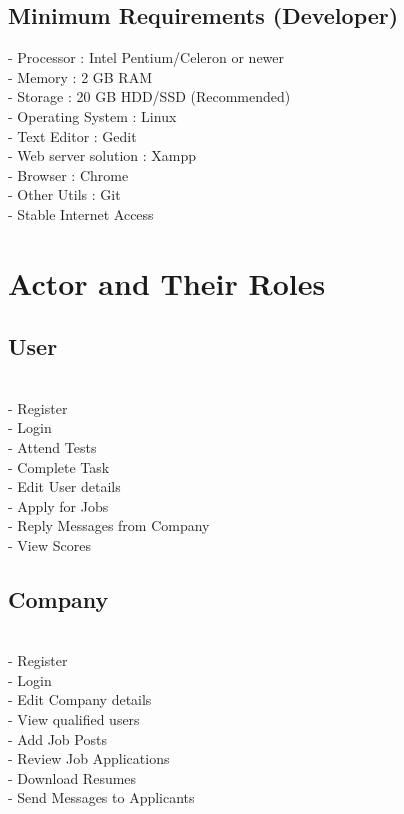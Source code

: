 \documentclass[a4paper,12pt]{report}
\begin{document}
\subsection{Minimum Requirements (Developer)}
\hspace*{12pt}
\subitem - Processor : Intel Pentium/Celeron or newer \\
\subitem - Memory : 2 GB RAM \\
\subitem - Storage : 20 GB HDD/SSD (Recommended) \\
\subitem - Operating System : Linux\\
\subitem - Text Editor : Gedit\\
\subitem - Web server solution : Xampp\\
\subitem - Browser : Chrome \\
\subitem - Other Utils : Git \\
\subitem - Stable Internet Access\\

\pagebreak

\section{Actor and Their Roles}
\subsection{User}

\subitem
\\ - Register
\\ - Login
\\ - Attend Tests
\\ - Complete Task
\\ - Edit User details
\\ - Apply for Jobs
\\ - Reply Messages from Company
\\ - View Scores

\subsection{Company}

\subitem
\\ - Register
\\ - Login
\\ - Edit Company details
\\ - View qualified users
\\ - Add Job Posts
\\ - Review Job Applications
\\ - Download Resumes
\\ - Send Messages to Applicants
\end{document}
